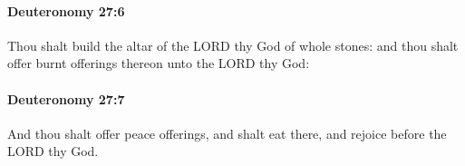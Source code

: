 		\paragraph{Deuteronomy 27:6} %
			\label{DEUTERONOMY-27-6}

			Thou shalt build the altar of the LORD thy God of whole stones: and thou shalt offer burnt offerings thereon unto the LORD thy God:


		\paragraph{Deuteronomy 27:7} %
			\label{DEUTERONOMY-27-7}

			And thou shalt offer peace offerings, and shalt eat there, and rejoice before the LORD thy God.



